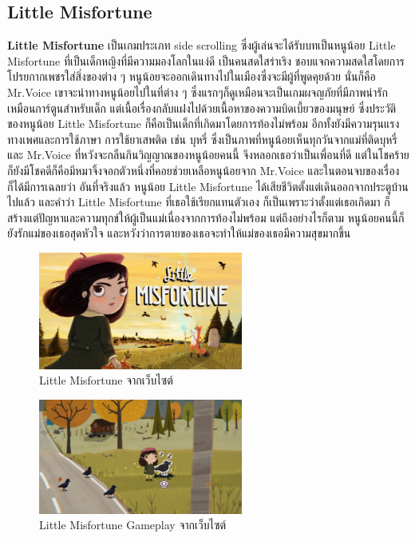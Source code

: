 \subsection{Little Misfortune}
\subsubitem \textbf{Little Misfortune}  เป็นเกมประเภท side scrolling ซึ่งผู้เล่นจะได้รับบทเป็นหนูน้อย Little Misfortune ที่เป็นเด็กหญิงที่มีความมองโลกในแง่ดี เป็นคนสดใสร่าเริง ชอบแจกความสดใสโดยการโปรยกากเพชรใส่สิ่งของต่าง ๆ หนูน้อยจะออกเดินทางไปในเมืองซึ่งจะมีผู้ที่พูดคุยด้วย นั่นก็คือ Mr.Voice เขาจะนำทางหนูน้อยไปในที่ต่าง ๆ ซึ่งแรกๆก็ดูเหมือนจะเป็นเกมผจญภัยที่มีภาพน่ารักเหมือนการ์ตูนสำหรับเด็ก แต่เนื้อเรื่องกลับแฝงไปด้วยเนื้อหาของความบิดเบี้ยวของมนุษย์ ซึ่งประวัติของหนูน้อย Little Misfortune ก็คือเป็นเด็กที่เกิดมาโดยการท้องไม่พร้อม อีกทั้งยังมีความรุนแรงทางเพศและการใช้ภาษา การใช้ยาเสพติด เช่น บุหรี่ ซึ่งเป็นภาพที่หนูน้อยเห็นทุกวันจากแม่ที่ติดบุหรี่ และ Mr.Voice ที่หวังจะกลืนกินวิญญาณของหนูน้อยคนนี้ จึงหลอกเธอว่าเป็นเพื่อนที่ดี แต่ในโชคร้ายก็ยังมีโชคดีก็คือมีหมาจิ้งจอกตัวหนึ่งที่คอยช่วยเหลือหนูน้อยจาก Mr.Voice และในตอนจบของเรื่องก็ได้มีการเฉลยว่า อันที่จริงแล้ว หนูน้อย Little Misfortune ได้เสียชีวิตตั้งแต่เดินออกจากประตูบ้านไปแล้ว และคำว่า Little Misfortune ที่เธอใช้เรียกแทนตัวเอง ก็เป็นเพราะว่าตั้งแต่เธอเกิดมา ก็สร้างแต่ปัญหาและความทุกข์ให้ผู้เป็นแม่เนื่องจากการท้องไม่พร้อม แต่ถึงอย่างไรก็ตาม หนูน้อยคนนี้ก็ยังรักแม่ของเธอสุดหัวใจ และหวังว่าการตายของเธอจะทำให้แม่ของเธอมีความสุขมากขึ้น
\begin{figure}[h]
  \centering
  \includegraphics[width=0.6\textwidth, height=0.2\textheight]{Images/little_misfortune.jpg}
  \caption{Little Misfortune จากเว็บไซต์}\label{little_misfurtune}
\end{figure}

\begin{figure}[h]
  \centering
  \includegraphics[width=0.6\textwidth, height=0.2\textheight]{Images/662px-Little_misfortune_sparkle_05.jpg}
  \caption{Little Misfortune Gameplay จากเว็บไซต์}\label{littleMisfortune1}
\end{figure}

